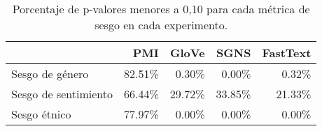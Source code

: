 

\begin{table}[h]
  \centering
  \begin{tabular}{lrrrr}
    \toprule
                         & PMI     & GloVe   & SGNS    & FastText \\
    \midrule
    Sesgo de género      & 82.51\% & 0.30\%  & 0.00\%  & 0.32\%   \\
    Sesgo de sentimiento & 66.44\% & 29.72\% & 33.85\% & 21.33\%  \\
    Sesgo étnico         & 77.97\% & 0.00\%  & 0.00\%  & 0.00\%   \\
    \bottomrule
  \end{tabular}
  \caption[Porcentaje de p-valores menores a 0,10 para cada métrica de sesgo en cada experimento]{
    Porcentaje de p-valores menores a 0,10 para cada métrica de sesgo en cada experimento.
  }
  \label{tab:pvalues}
\end{table}

